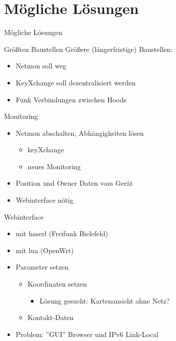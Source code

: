 \section{Mögliche Lösungen}
\begin{frame}{}
    \begin{center}
        Mögliche Lösungen
     \end{center}
\end{frame}

\begin{frame}{Größten Baustellen}
    Größere (längerfristige) Baustellen:
    \begin{itemize}
        \item Netmon soll weg
        \item KeyXchange soll dezentralisiert werden
        \item Funk Verbindungen zwischen Hoods
    \end{itemize}
\end{frame}

\begin{frame}{Monitoring}
    \begin{itemize}
        \item Netmon abschalten, Abhängigkeiten lösen
        \begin{itemize}
            \item keyXchange
            \item neues Monitoring
        \end{itemize}
        \item Position und Owner Daten vom Gerät
        \item Webinterface nötig
    \end{itemize}
\end{frame}

\begin{frame}{Webinterface}
    \begin{itemize}
        \item \zb{} mit haserl (Freifunk Bielefeld)
        \item \zb{} mit lua (OpenWrt)
        \item Parameter setzen
        \begin{itemize}
            \item Koordinaten setzen
                \begin{itemize}
                    \item Lösung gesucht: Kartenansicht ohne Netz?
                \end{itemize}
            \item Kontakt-Daten
        \end{itemize}
        \item Problem: ''GUI'' Browser und IPv6 Link-Local
    \end{itemize}
\end{frame}

